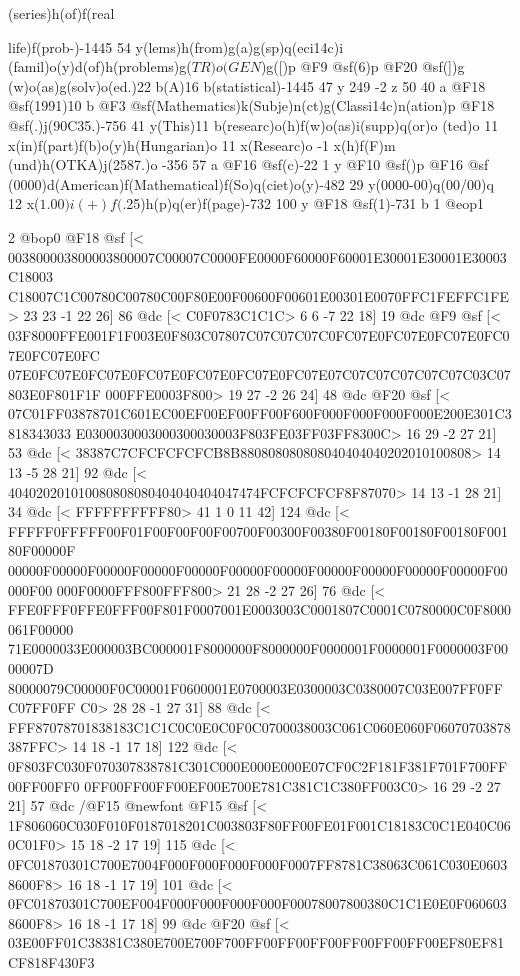 (series)h(of)f(real{life)f(prob-)-1445 54 y(lems)h(from)g(a)g(sp)q(eci\014c)i
(famil)o(y)d(of)h(problems)g(\(TR)o(GEN\))g([)p @F9 @sf(6)p @F20 @sf(])g
(w)o(as)g(solv)o(ed.)22 b(A)16 b(statistical)-1445 47 y 249 -2 z 50 40 a 
@F18 @sf(1991)10 b @F3 @sf(Mathematics)k(Subje)n(ct)g(Classi\014c)n(ation)p 
@F18 @sf(.)j(90C35.)-756 41 y(This)11 b(researc)o(h)f(w)o(as)i(supp)q(or)o
(ted)o 11 x(in)f(part)f(b)o(y)h(Hungarian)o 11 x(Researc)o -1 x(h)f(F)m
(und)h(OTKA)j(2587.)o -356 57 a @F16 @sf(c)-22 1 y @F10 @sf()p @F16 @sf
(0000)d(American)f(Mathematical)f(So)q(ciet)o(y)-482 29 y(0000-00)q(00/00)q 
12 x($1.00)i(+)f($.25)h(p)q(er)f(page)-732 100 y @F18 @sf(1)-731 b
1 @eop1

2 @bop0
@F18 @sf
[<
003800003800003800007C00007C0000FE0000F60000F60001E30001E30001E30003C18003
C18007C1C00780C00780C00F80E00F00600F00601E00301E0070FFC1FEFFC1FE>
	 23 23 -1 22 26] 86 @dc
[<
C0F0783C1C1C>
	 6 6 -7 22 18] 19 @dc
@F9 @sf
[<
03F8000FFE001F1F003E0F803C07807C07C07C07C0FC07E0FC07E0FC07E0FC07E0FC07E0FC
07E0FC07E0FC07E0FC07E0FC07E0FC07E0FC07E07C07C07C07C07C07C03C07803E0F801F1F
000FFE0003F800>
	 19 27 -2 26 24] 48 @dc
@F20 @sf
[<
07C01FF03878701C601EC00EF00EF00FF00F600F000F000F000F000E200E301C3818343033
E0300030003000300030003F803FE03FF03FF8300C>
	 16 29 -2 27 21] 53 @dc
[<
38387C7CFCFCFCFCB8B880808080808040404040202010100808>
	 14 13 -5 28 21] 92 @dc
[<
404020201010080808080404040404047474FCFCFCFCF8F87070>
	 14 13 -1 28 21] 34 @dc
[<
FFFFFFFFFF80>
	 41 1 0 11 42] 124 @dc
[<
FFFFF0FFFFF00F01F00F00F00F00700F00300F00380F00180F00180F00180F00180F00000F
00000F00000F00000F00000F00000F00000F00000F00000F00000F00000F00000F00000F00
000F0000FFF800FFF800>
	 21 28 -2 27 26] 76 @dc
[<
FFE0FFF0FFE0FFF00F801F0007001E0003003C0001807C0001C0780000C0F8000061F00000
71E0000033E000003BC000001F8000000F8000000F0000001F0000001F0000003F0000007D
80000079C00000F0C00001F0600001E0700003E0300003C0380007C03E007FF0FFC07FF0FF
C0>
	 28 28 -1 27 31] 88 @dc
[<
FFF87078701838183C1C1C0C0E0C0F0C0700038003C061C060E060F06070703878387FFC>
	 14 18 -1 17 18] 122 @dc
[<
0F803FC030F070307838781C301C000E000E000E07CF0C2F181F381F701F700FF00FF00FF0
0FF00FF00FF00EF00E700E781C381C1C380FF003C0>
	 16 29 -2 27 21] 57 @dc
/@F15 @newfont
@F15 @sf
[<
1F806060C030F010F0187018201C003803F80FF00FE01F001C18183C0C1E040C060C01F0>
	 15 18 -2 17 19] 115 @dc
[<
0FC01870301C700E7004F000F000F000F000F0007FF8781C38063C061C030E06038600F8>
	 16 18 -1 17 19] 101 @dc
[<
0FC01870301C700EF004F000F000F000F000F00078007800380C1C1E0E0F0606038600F8>
	 16 18 -1 17 18] 99 @dc
@F20 @sf
[<
03E00FF01C38381C380E700E700F700FF00FF00FF00FF00FF00FF00EF80EF81CF818F430F3
}
